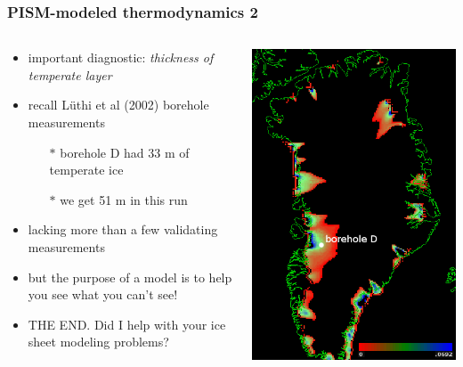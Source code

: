 \documentclass{beamer}
\begin{document}
\begin{frame}
  \frametitle{PISM-modeled thermodynamics 2}

\begin{columns}
\begin{column}{0.6\textwidth}
\begin{itemize}
\small
\item important diagnostic: \emph{thickness of temperate layer}
\item recall L\"uthi et al (2002) borehole measurements
  \begin{itemize}
  \item[$\ast$] borehole D had 33 m of temperate ice
  \item[$\ast$] we get 51 m in this run
  \end{itemize}
\item lacking more than a few validating measurements
\item but the purpose of a model is to help you see what you can't see!
\item \alert{THE END.}  Did I help with your ice sheet modeling problems?
\end{itemize}
\end{column}
\begin{column}{0.4\textwidth}
\begin{center}
    \includegraphics[width=\textwidth]{bmelt_result_boreD}

\end{center}
\end{column}
\end{columns}
\end{frame}
\end{document}
